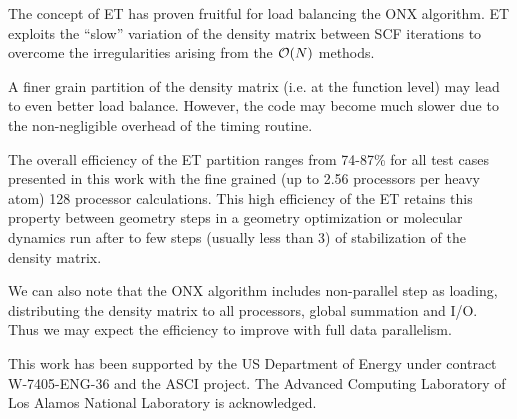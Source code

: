 \documentclass[prl,twocolumn,twocolumngrid,superbib]{revtex4}
\begin{document}
 The concept of ET has proven fruitful for load balancing the ONX 
 algorithm. ET exploits the ``slow'' variation of the density matrix 
 between SCF iterations to overcome the irregularities arising 
 from the ${\cal O}(N)$ methods.

 A finer grain partition of the density matrix (i.e. at the function level)
 may lead to even better load balance. However, the code 
 may become much slower due to the non-negligible overhead 
 of the timing routine.

 The overall efficiency of the ET partition ranges from 74-87\%
 for all test cases presented in this work with the fine grained
 (up to 2.56 processors per heavy atom) 128 processor calculations.
 This high efficiency of the ET retains this property between geometry steps
 in a geometry optimization or molecular dynamics run after
 to few steps (usually less than 3) of stabilization of the density matrix.

 We can also note that the ONX algorithm includes non-parallel step as
 loading, distributing the density matrix to all
 processors, global summation and I/O. Thus we may expect 
 the efficiency to improve with full data parallelism.

\begin{acknowledgments}
 This work has been supported by the US Department of Energy
 under contract W-7405-ENG-36 and the ASCI project.
 The Advanced Computing Laboratory of Los
 Alamos National Laboratory is acknowledged.
\end{acknowledgments}

%
\newpage


\end{document}
